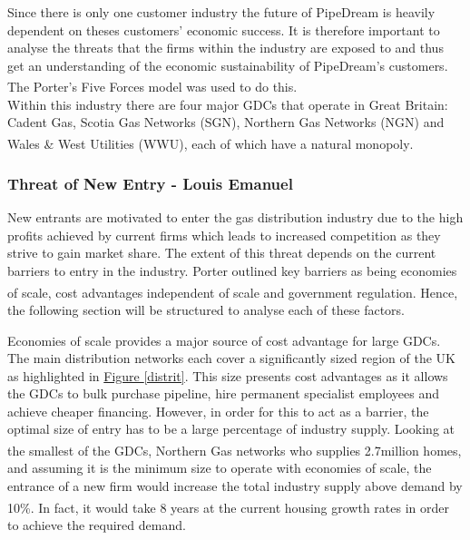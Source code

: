 \documentclass[11pt]{article}		%
\newcommand{\supercite}[1]{\textsuperscript{\cite{#1}}}		%
\newcommand{\figref}[1]{\hyperref[#1]{Figure \ref*{#1}}}    %
\begin{document}
        Since there is only one customer industry the future of PipeDream is heavily dependent on theses customers' economic success. It is therefore important to analyse the threats that the firms within the industry are exposed to and thus get an understanding of the economic sustainability of PipeDream's customers.
		The Porter's Five Forces model\supercite{porter2008five} was used to do this.
		\\
		\hspace*{2ex}Within this industry there are four major GDCs that operate in Great Britain: Cadent Gas, Scotia Gas Networks (SGN), Northern Gas Networks (NGN) and Wales \& West Utilities (WWU), each of which have a natural monopoly\supercite{Gas_Distribution_Industry}.  %
			
		\subsubsection[Threat of New Entry]{Threat of New Entry - Louis Emanuel}
		
				New entrants are motivated to enter the gas distribution industry due to the high profits achieved by current firms which leads to increased competition as they strive to gain market share. The extent of this threat depends on the current barriers to entry in the industry. Porter outlined key barriers as being economies of scale, cost advantages independent of scale and government regulation\supercite{porter2008five}. Hence, the following section will be structured to analyse each of these factors.
				
	            Economies of scale provides a major source of cost advantage for large GDCs. The main distribution networks each cover a significantly sized region of the UK as highlighted in \figref{distrit}. This size presents cost advantages as it allows the GDCs to bulk purchase pipeline, hire permanent specialist employees and achieve cheaper financing. However, in order for this to act as a barrier, the optimal size of entry has to be a large percentage of industry supply. Looking at the smallest of the GDCs, Northern Gas networks who supplies 2.7million homes\supercite{NGNhouses}, and assuming it is the minimum size to operate with economies of scale, the entrance of a new firm would increase the total industry supply above demand by 10\%\supercite{households}. In fact, it would take 8 years at the current housing growth rates in order to achieve the required demand. 
	            
\end{document}
